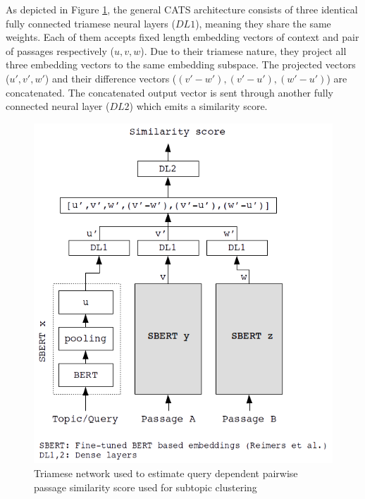 As depicted in Figure \ref{fig:triam}, the general CATS architecture consists of three identical fully connected triamese neural layers ($DL1$), meaning they share the same weights. Each of them accepts fixed length embedding vectors of context and pair of passages respectively ($u,v,w$). Due to their triamese nature, they project all three embedding vectors to the same embedding subspace. The projected vectors ($u',v',w'$) and their difference vectors ($(v'-w'),(v'-u'),(w'-u')$) are concatenated. The concatenated output vector is sent through another fully connected neural layer ($DL2$) which emits a similarity score.
\begin{figure}[h]
  \centering
  \includegraphics[width=\linewidth]{graphics/triamese.png}
  \caption{Triamese network used to estimate query dependent pairwise passage similarity score used for subtopic clustering}
  \label{fig:triam}
\end{figure}

